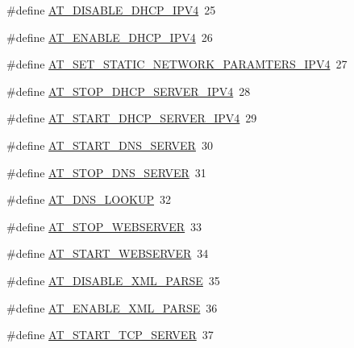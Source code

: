 \begin{DoxyCompactItemize}
\#define \hyperlink{group__wireless__interface_ga84dbaacc18189852578b4b92024f74be}{A\+T\+\_\+\+D\+I\+S\+A\+B\+L\+E\+\_\+\+D\+H\+C\+P\+\_\+\+I\+P\+V4}~25
\item 
\#define \hyperlink{group__wireless__interface_gaae19c751b0a8f3f0c1efc844b82dcbb0}{A\+T\+\_\+\+E\+N\+A\+B\+L\+E\+\_\+\+D\+H\+C\+P\+\_\+\+I\+P\+V4}~26
\item 
\#define \hyperlink{group__wireless__interface_gafb0de0f1941fdbabc80fe8107f181e71}{A\+T\+\_\+\+S\+E\+T\+\_\+\+S\+T\+A\+T\+I\+C\+\_\+\+N\+E\+T\+W\+O\+R\+K\+\_\+\+P\+A\+R\+A\+M\+T\+E\+R\+S\+\_\+\+I\+P\+V4}~27
\item 
\#define \hyperlink{group__wireless__interface_ga87f7bc046f44fb467fded510d8134c14}{A\+T\+\_\+\+S\+T\+O\+P\+\_\+\+D\+H\+C\+P\+\_\+\+S\+E\+R\+V\+E\+R\+\_\+\+I\+P\+V4}~28
\item 
\#define \hyperlink{group__wireless__interface_gaaf480ed9a32e4264041aef16a6ee9308}{A\+T\+\_\+\+S\+T\+A\+R\+T\+\_\+\+D\+H\+C\+P\+\_\+\+S\+E\+R\+V\+E\+R\+\_\+\+I\+P\+V4}~29
\item 
\#define \hyperlink{group__wireless__interface_gab6c8f6350c374e217d5e4278c3e29a7a}{A\+T\+\_\+\+S\+T\+A\+R\+T\+\_\+\+D\+N\+S\+\_\+\+S\+E\+R\+V\+ER}~30
\item 
\#define \hyperlink{group__wireless__interface_gaa7b1c94859cb9f22152767684349dba6}{A\+T\+\_\+\+S\+T\+O\+P\+\_\+\+D\+N\+S\+\_\+\+S\+E\+R\+V\+ER}~31
\item 
\#define \hyperlink{group__wireless__interface_gab5788c492880edc85686492518cc613f}{A\+T\+\_\+\+D\+N\+S\+\_\+\+L\+O\+O\+K\+UP}~32
\item 
\#define \hyperlink{group__wireless__interface_gad1c394d6e2f921efe491850e3b08f130}{A\+T\+\_\+\+S\+T\+O\+P\+\_\+\+W\+E\+B\+S\+E\+R\+V\+ER}~33
\item 
\#define \hyperlink{group__wireless__interface_ga30cb8cf7ab85186c87f29e83c1fa5d7a}{A\+T\+\_\+\+S\+T\+A\+R\+T\+\_\+\+W\+E\+B\+S\+E\+R\+V\+ER}~34
\item 
\#define \hyperlink{group__wireless__interface_ga6b5d2911a82b9ddeb1150f5e788a2797}{A\+T\+\_\+\+D\+I\+S\+A\+B\+L\+E\+\_\+\+X\+M\+L\+\_\+\+P\+A\+R\+SE}~35
\item 
\#define \hyperlink{group__wireless__interface_gaf5cbe2319e99a95b7b4a48f8cc7e6012}{A\+T\+\_\+\+E\+N\+A\+B\+L\+E\+\_\+\+X\+M\+L\+\_\+\+P\+A\+R\+SE}~36
\item 
\#define \hyperlink{group__wireless__interface_ga80aa971012d6042326c6c4a29ce6f70f}{A\+T\+\_\+\+S\+T\+A\+R\+T\+\_\+\+T\+C\+P\+\_\+\+S\+E\+R\+V\+ER}~37
\item 

\end{DoxyCompactItemize}
